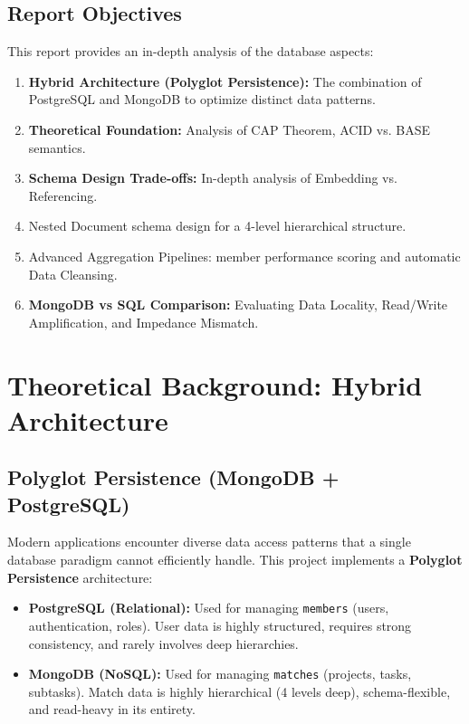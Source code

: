 \documentclass[a4paper,12pt]{article}
\begin{document}
\subsection{Report Objectives}
This report provides an in-depth analysis of the database aspects:
\begin{enumerate}
    \item \textbf{Hybrid Architecture (Polyglot Persistence):} The combination of PostgreSQL and MongoDB to optimize distinct data patterns.
    \item \textbf{Theoretical Foundation:} Analysis of CAP Theorem, ACID vs. BASE semantics.
    \item \textbf{Schema Design Trade-offs:} In-depth analysis of Embedding vs. Referencing.
    \item Nested Document schema design for a 4-level hierarchical structure.
    \item Advanced Aggregation Pipelines: member performance scoring and automatic Data Cleansing.
    \item \textbf{MongoDB vs SQL Comparison:} Evaluating Data Locality, Read/Write Amplification, and Impedance Mismatch.
\end{enumerate}

\newpage

\section{Theoretical Background: Hybrid Architecture}

\subsection{Polyglot Persistence (MongoDB + PostgreSQL)}
Modern applications encounter diverse data access patterns that a single database paradigm cannot efficiently handle. This project implements a \textbf{Polyglot Persistence} architecture:
\begin{itemize}
    \item \textbf{PostgreSQL (Relational):} Used for managing \texttt{members} (users, authentication, roles). User data is highly structured, requires strong consistency, and rarely involves deep hierarchies.
    \item \textbf{MongoDB (NoSQL):} Used for managing \texttt{matches} (projects, tasks, subtasks). Match data is highly hierarchical (4 levels deep), schema-flexible, and read-heavy in its entirety.
\end{itemize}
\end{document}
